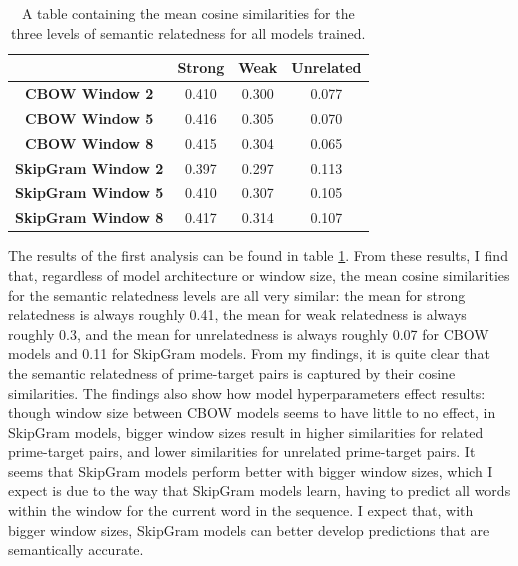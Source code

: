 \documentclass{IEEEtran}
\begin{document}
\begin{table}
    \centering
    \begin{tabular}{c|c|c|c}
        & \textbf{Strong} & \textbf{Weak} & \textbf{Unrelated} \\
        \hline \hline
        \textbf{CBOW Window 2} &0.410 &0.300 &0.077 \\
        \textbf{CBOW Window 5} &0.416 &0.305 &0.070 \\
        \textbf{CBOW Window 8} &0.415 &0.304 &0.065 \\
        \textbf{SkipGram Window 2} &0.397 &0.297 &0.113 \\
        \textbf{SkipGram Window 5} &0.410 &0.307 &0.105 \\
        \textbf{SkipGram Window 8} &0.417 &0.314 &0.107 
    \end{tabular}
    \caption{A table containing the mean cosine similarities for the three levels of semantic relatedness for all models trained.}
    \label{tab:mean_cosine_similarity_by_semantic_relatedness}
\end{table}

The results of the first analysis can be found in table \ref{tab:mean_cosine_similarity_by_semantic_relatedness}.
From these results, I find that, regardless of model architecture or window size, the mean cosine similarities for the semantic relatedness levels are all very similar: the mean for strong relatedness is always roughly 0.41, the mean for weak relatedness is always roughly 0.3, and the mean for unrelatedness is always roughly 0.07 for CBOW models and 0.11 for SkipGram models.
From my findings, it is quite clear that the semantic relatedness of prime-target pairs is captured by their cosine similarities.
The findings also show how model hyperparameters effect results: though window size between CBOW models seems to have little to no effect, in SkipGram models, bigger window sizes result in higher similarities for related prime-target pairs, and lower similarities for unrelated prime-target pairs.
It seems that SkipGram models perform better with bigger window sizes, which I expect is due to the way that SkipGram models learn, having to predict all words within the window for the current word in the sequence.
I expect that, with bigger window sizes, SkipGram models can better develop predictions that are semantically accurate.
\end{document}
